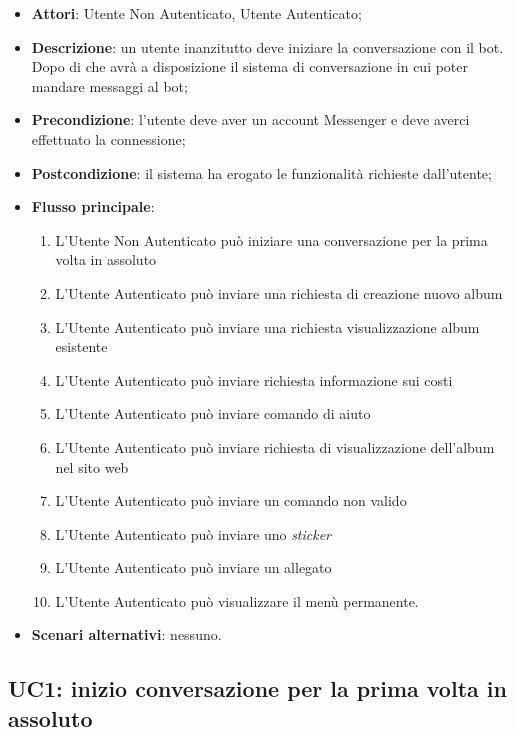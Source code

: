 \begin{itemize}
  \item \textbf{Attori}: Utente Non Autenticato, Utente Autenticato;
  \item \textbf{Descrizione}: un utente inanzitutto deve iniziare la
conversazione con il bot. Dopo di che avrà a disposizione il sistema di
conversazione in cui poter mandare messaggi al bot;
  \item \textbf{Precondizione}: l'utente deve aver un account Messenger e deve
averci effettuato la connessione;
  \item \textbf{Postcondizione}: il sistema ha erogato le funzionalità
richieste dall'utente;
  \item \textbf{Flusso principale}:
  \begin{enumerate}
    \item L'Utente Non Autenticato può iniziare una conversazione per la prima
volta in assoluto
    \item L'Utente Autenticato può inviare una richiesta di creazione nuovo
album %
    \item L'Utente Autenticato può inviare una richiesta visualizzazione album
esistente
    \item L'Utente Autenticato può inviare richiesta informazione sui costi
    \item L'Utente Autenticato può inviare comando di aiuto
    \item L'Utente Autenticato può inviare richiesta di visualizzazione
dell'album nel sito web
    \item L'Utente Autenticato può inviare un comando non valido
    \item L'Utente Autenticato può inviare uno \textit{sticker}
    \item L'Utente Autenticato può inviare un allegato %
    \item L'Utente Autenticato può visualizzare il menù permanente.
  \end{enumerate}
  \item \textbf{Scenari alternativi}: nessuno.
\end{itemize}



\subsection{UC1: inizio conversazione per la prima volta in assoluto}
\label{uc:uc1}

